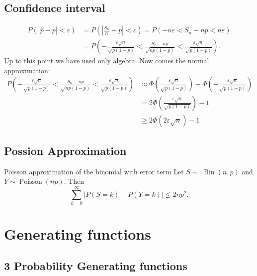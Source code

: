 \documentclass[11pt]{elegantbook}
\begin{document}
\section{Confidence interval}
$$
\begin{aligned}
P(|\widehat{p}-p|<\varepsilon) & =P\left(\left|\frac{S_n}{n}-p\right|<\varepsilon\right)=P\left(-n \varepsilon<S_n-n p<n \varepsilon\right) \\
& =P\left(-\frac{\varepsilon \sqrt{n}}{\sqrt{p(1-p)}}<\frac{S_n-n p}{\sqrt{n p(1-p)}}<\frac{\varepsilon \sqrt{n}}{\sqrt{p(1-p)}}\right) .
\end{aligned}
$$
Up to this point we have used only algebra. Now comes the normal approximation:
$$
\begin{aligned}
P\left(-\frac{\varepsilon \sqrt{n}}{\sqrt{p(1-p)}}<\frac{S_n-n p}{\sqrt{n p(1-p)}}<\frac{\varepsilon \sqrt{n}}{\sqrt{p(1-p)}}\right) & \approx \Phi\left(\frac{\varepsilon \sqrt{n}}{\sqrt{p(1-p)}}\right)-\Phi\left(-\frac{\varepsilon \sqrt{n}}{\sqrt{p(1-p)}}\right) \\
& =2 \Phi\left(\frac{\varepsilon \sqrt{n}}{\sqrt{p(1-p)}}\right)-1\\
&\geq 2 \Phi(2 \varepsilon \sqrt{n})-1
\end{aligned}
$$
\section{Possion Approximation}
\begin{theorem}{Poisson approximation of the binomial with error term}
Let $S \sim$ $\operatorname{Bin}(n, p)$ and $Y \sim \operatorname{Poisson}(n p)$. Then
$$
\sum_{k=0}^{\infty}|P(S=k)-P(Y=k)| \leq 2 n p^2 .
$$
\end{theorem}
\chapter{Generating functions}
\section{3 Probability Generating functions}
\end{document}
